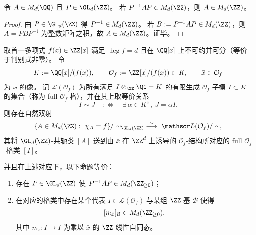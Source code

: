 \begin{proposition}\label{prop:xi-hankel-integrality-preserved-under-unimodular-conjugacy}
令 \(A\in M_d(\QQ)\) 且 \(P\in \GL_d(\ZZ)\)。
若 \(P^{-1}AP\in M_d(\ZZ)\)，则 \(A\in M_d(\ZZ)\)。
\end{proposition}
\begin{proof}
由 \(P\in\GL_d(\ZZ)\) 得 \(P^{-1}\in M_d(\ZZ)\)。
若 \(B:=P^{-1}AP\in M_d(\ZZ)\)，则 \(A=PBP^{-1}\) 为整数矩阵之积，故 \(A\in M_d(\ZZ)\)。证毕。
\end{proof}

\begin{theorem}[平方因子自由特征多项式的格参数化与非负实现判据]\label{thm:xi-hankel-nonnegative-kernelization-idealclass-obstruction}
取首一多项式 \(f(x)\in\ZZ[x]\) 满足 \(\deg f=d\) 且在 \(\QQ[x]\) 上不可约并可分（等价于判别式非零）。
令
\[
K:=\QQ[x]/(f(x)),
\qquad
\mathcal O_f:=\ZZ[x]/(f(x))\subset K,
\qquad
\bar x\in \mathcal O_f
\]
为 \(x\) 的像。
记 \(\mathscr L(\mathcal O_f)\) 为所有满足 \(I\otimes_{\ZZ}\QQ=K\) 的有限生成 \(\mathcal O_f\)-子模 \(I\subset K\) 的集合（称为 full \(\mathcal O_f\)-格），并在其上取等价关系
\[
I\sim J\quad:\Longleftrightarrow\quad \exists\,\alpha\in K^\times,\ J=\alpha I.
\]
则存在自然双射
\[
\{A\in M_d(\ZZ):\ \chi_A=f\}/\sim_{\GL_d(\ZZ)}
\ \stackrel{\sim}{\longrightarrow}\
\mathscr L(\mathcal O_f)/\sim,
\]
其将 \(\GL_d(\ZZ)\)-共轭类 \([A]\) 送到由 \(\bar x\) 在 \(\ZZ^d\) 上诱导的 \(\mathcal O_f\)-结构所对应的 full \(\mathcal O_f\)-格类 \([I]\)。
\par
并且在上述对应下，以下命题等价：
\begin{enumerate}
  \item 存在 \(P\in \GL_d(\ZZ)\) 使 \(P^{-1}AP\in M_d(\ZZ_{\ge 0})\)；
  \item 在对应的格类中存在某个代表 \(I\in\mathscr L(\mathcal O_f)\) 与某组 \(\ZZ\)-基 \(\mathcal B\) 使得
  \[
  [m_{\bar x}]_{\mathcal B}\in M_d(\ZZ_{\ge 0}),
  \]
  其中 \(m_{\bar x}:I\to I\) 为乘以 \(\bar x\) 的 \(\ZZ\)-线性自同态。
\end{enumerate}
\end{theorem}
